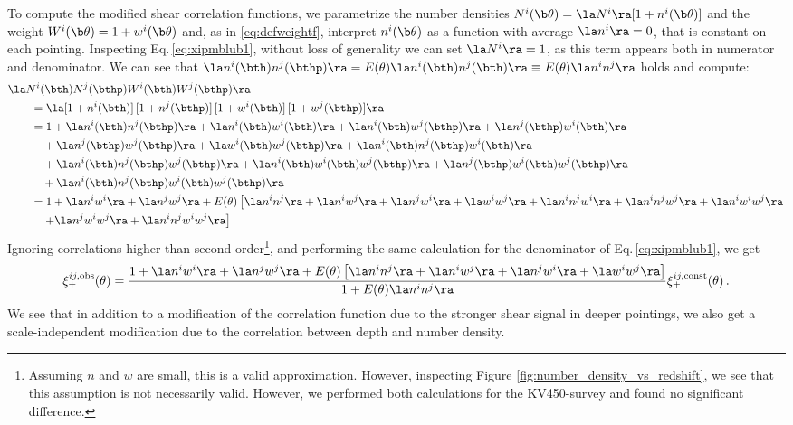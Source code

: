 To compute the modified shear correlation functions, we parametrize the number densities \linebreak$N^{i}(\b \theta)=\la N^{i} \ra [1+n^{i}(\b \theta)]$ and the weight $W^{i}(\b \theta)=1+w^{i}(\b \theta)$ and, as in \eqref{eq:defweightf}, interpret $n^{i}(\b \theta)$ as a function with average $\la n^{i} \ra = 0$, that is constant on each pointing. Inspecting Eq.\,\eqref{eq:xipmblub1}, without loss of generality we can set $\la N^i\ra = 1$, as this term appears both in numerator and denominator. We can see that $\la n^i(\bth)n^j(\bthp)\ra = E(\theta)\la n^i(\bth)n^j(\bth)\ra \equiv E(\theta)\la n^i n^j \ra$ holds and compute:
\begin{align}
&\la N^i(\bth)N^j(\bthp)W^i(\bth)W^j(\bthp)\ra \nonumber\\
&\qquad =  \la [1+n^i(\bth)]\,[1+n^j(\bthp)]\,[1+w^i(\bth)]\,[1+w^j(\bthp)]\ra \nonumber\\
&\qquad =  1 + \la n^i(\bth)n^j(\bthp)\ra + \la n^i(\bth)w^i(\bth)\ra + \la n^i(\bth)w^j(\bthp)\ra + \la n^j(\bthp) w^i(\bth)\ra \nonumber\\
&\qquad\quad + \la n^j(\bthp) w^j(\bthp) \ra + \la w^i(\bth)w^j(\bthp)\ra + \la n^i(\bth)n^j(\bthp)w^i(\bth)\ra \nonumber\\
&\qquad\quad + \la n^i(\bth)n^j(\bthp)w^j(\bthp)\ra  + \la n^i(\bth)w^i(\bth)w^j(\bthp)\ra + \la n^j(\bthp) w^i(\bth)w^j(\bthp)\ra \nonumber\\
&\qquad\quad + \la  n^i(\bth)n^j(\bthp)w^i(\bth)w^j(\bthp)\ra \nonumber\\
&\qquad =  1 + \la n^iw^i\ra + \la n^j w^j\ra + E(\theta)\left[ \la n^in^j\ra + \la n^i w^j \ra  + \la n^jw^i\ra + \la w^iw^j\ra + \la n^in^jw^i\ra + \la n^in^jw^j\ra + \la n^iw^iw^j\ra \right. \nonumber\\
&\qquad\quad \left. + \la n^jw^iw^j\ra + \la n^in^jw^iw^j\ra  \right] 
 \end{align}
Ignoring correlations higher than second order\footnote{Assuming $n$ and $w$ are small, this is a valid approximation. However, inspecting Figure \ref{fig:number_density_vs_redshift}, we see that this assumption is not necessarily valid. However, we performed both calculations for the KV450-survey and found no significant difference.}, and performing the same calculation for the denominator of Eq.\,\eqref{eq:xipmblub1}, we get
 \begin{align}
 \xi^{ij,\rm{obs}}_\pm(\theta) = \frac{1 + \la n^iw^i\ra + \la n^jw^j\ra + E(\theta)\left[\la n^in^j\ra + \la n^iw^j\ra + \la n^j w^i\ra + \la w^iw^j\ra\right]}{1+E(\theta)\la n^i n^j\ra }\xi^{ij,\rm{const}}_\pm (\theta) \, .
 \end{align}
We see that in addition to a modification of the correlation function due to the stronger shear signal in deeper pointings, we also get a scale-independent modification due to the correlation between depth and number density.

